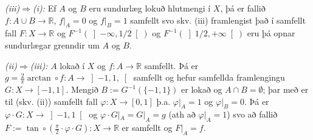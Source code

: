 \documentclass[a4paper,icelandic]{book}
\theoremstyle{definition}
\theoremstyle{plain}
\theoremstyle{remark}
\newcommand{\R}{\mathbb{R}} %
\begin{document}
\emph{(iii)$\Rightarrow$(i):} Ef $A$ og $B$ eru sundurlæg lokuð
hlutmengi í $X$, þá er fallið $f:A\cup B\to\R$, $f|_A=0$ og $f|_B=1$
samfellt svo skv. (iii) framlengist það í samfellt fall $F:X\to\R$ og
$F^{-1}(\left]-\infty,1/2\right[)$ og $F^{-1}(\left]1/2,+\infty\right[)$
eru þá opnar sundurlægar grenndir um $A$ og $B$.

\emph{(ii)$\Rightarrow$(iii):} $A$ lokað í $X$ og $f:A\to\R$ samfellt.
Þá er $g=\frac 2\pi \arctan\circ f: A\to\left]-1,1,\right[$ samfellt og
hefur samfellda framlengingu $G:X\to\left[ -1,1 \right]$. Mengið
$B:=G^{-1}(\{-1,1\})$ er lokað og $A\cap B=\emptyset$; þar með er til
(skv. (ii)) samfellt fall $\varphi:X\to\left[ 0,1 \right]$ þ.a.
$\varphi|_A=1$ og $\varphi|_B=0$. Þá er $\varphi\cdot
G:X\to\left]-1,1\right[$ og $\varphi\cdot G|_A=G|_A=g$ (ath að
$\varphi|_A=1$) svo að fallið
$F:=\tan\circ(\frac{\pi}{2}\cdot\varphi\cdot G):X\to\R$ er samfellt og
$F|_A=f$.
\end{document}
